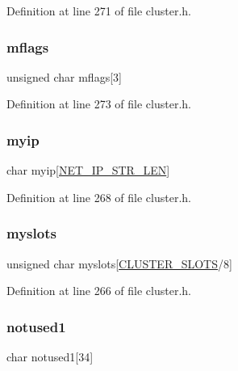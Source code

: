 Definition at line 271 of file cluster.\+h.

\mbox{\label{structcluster_msg_a4b3606717108e723301f368f58e8ac55}} 
\subsubsection{\texorpdfstring{mflags}{mflags}}
{\footnotesize\ttfamily unsigned char mflags\mbox{[}3\mbox{]}}



Definition at line 273 of file cluster.\+h.

\mbox{\label{structcluster_msg_adc202e2ef9102baf45fe88d6adfbdb9d}} 
\subsubsection{\texorpdfstring{myip}{myip}}
{\footnotesize\ttfamily char myip\mbox{[}\hyperlink{server_8h_ad97c5405ed22a94e9fcc10fba577d6c0}{N\+E\+T\+\_\+\+I\+P\+\_\+\+S\+T\+R\+\_\+\+L\+EN}\mbox{]}}



Definition at line 268 of file cluster.\+h.

\mbox{\label{structcluster_msg_a5208677bb0ea19be90a6a6a5b742b7bf}} 
\subsubsection{\texorpdfstring{myslots}{myslots}}
{\footnotesize\ttfamily unsigned char myslots\mbox{[}\hyperlink{cluster_8h_aa3e2cb951eebb16725ecc3f5beefd9fd}{C\+L\+U\+S\+T\+E\+R\+\_\+\+S\+L\+O\+TS}/8\mbox{]}}



Definition at line 266 of file cluster.\+h.

\mbox{\label{structcluster_msg_a1755ac7161beb0d2bf27b9dacb7e3888}} 
\subsubsection{\texorpdfstring{notused1}{notused1}}
{\footnotesize\ttfamily char notused1\mbox{[}34\mbox{]}}



